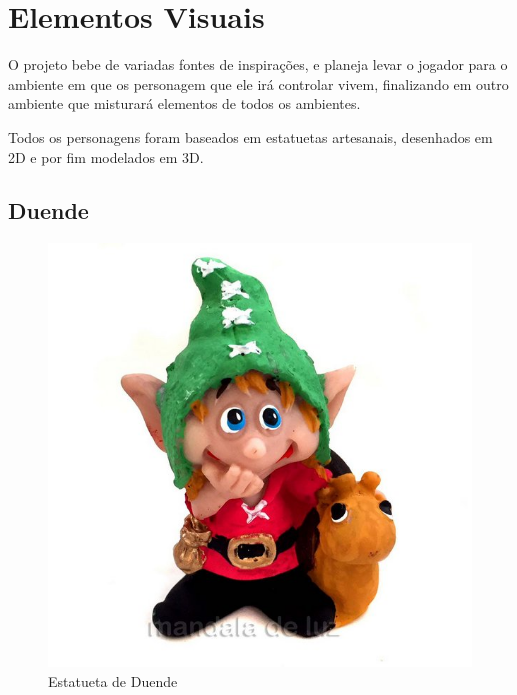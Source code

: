 
\section{Elementos Visuais}
O projeto bebe de variadas fontes de inspirações, e planeja levar o jogador para o ambiente em que os personagem que ele irá controlar vivem, finalizando em outro ambiente que misturará elementos de todos os ambientes.


Todos os personagens foram baseados em estatuetas artesanais, desenhados em 2D e por fim modelados em 3D.

\subsection{Duende}
\begin{figure}[htb]
	\caption{\label{duendeRef}Estatueta de Duende}
	\begin{center}
	    \includegraphics[width=\textwidth/2]{imagens/duendeRef.jpg}
	\end{center}
\end{figure}



